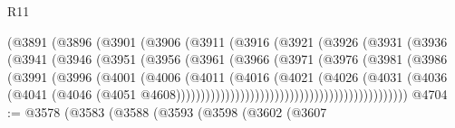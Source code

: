 \begin{lexlean}{R11}
\begin{coremodule}
                                (@3891
                                  (@3896
                                    (@3901
                                      (@3906
                                        (@3911
                                          (@3916
                                            (@3921
                                              (@3926
                                                (@3931
                                                  (@3936
                                                    (@3941
                                                      (@3946
                                                        (@3951
                                                          (@3956
                                                            (@3961
                                                              (@3966
                                                                (@3971
                                                                  (@3976
                                                                    (@3981
                                                                      (@3986
                                                                        (@3991
                                                                          (@3996
                                                                            (@4001
                                                                              (@4006
                                                                                (@4011
                                                                                  (@4016
                                                                                    (@4021
                                                                                      (@4026
                                                                                        (@4031
                                                                                          (@4036
                                                                                            (@4041
                                                                                              (@4046
                                                                                                (@4051
                                                                                                  @4608)))))))))))))))))))))))))))))))))))))))))))))))
@4704 := @3578
    (@3583
      (@3588
        (@3593
          (@3598
            (@3602
              (@3607

\end{coremodule}
\end{lexlean}
